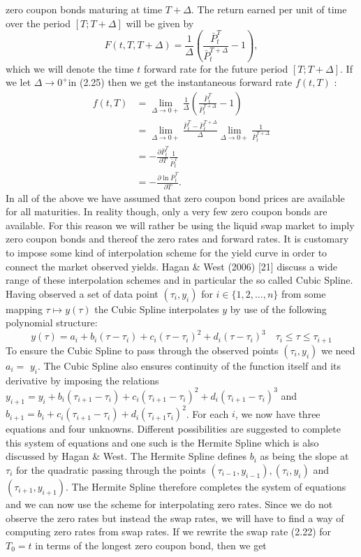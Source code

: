 \documentclass[12pt,twoside]{reedthesis}
\begin{document}
zero coupon bonds maturing at time \(T+\Delta\). The return earned per unit of time over the period \([T ; T+\Delta]\) will be given by
\[
F(t, T, T+\Delta)=\frac{1}{\Delta}\left(\frac{\bar{P}_{t}^{T}}{\bar{P}_{t}^{T+\Delta}}-1\right),
\]
which we will denote the time \(t\) forward rate for the future period \([T ; T+\Delta]\). If we let \(\Delta \rightarrow 0^{+}\)in (2.25) then we get the instantaneous forward rate \(f(t, T)\) :
\[
\begin{aligned}
f(t, T) &=\lim _{\Delta \rightarrow 0+} \frac{1}{\Delta}\left(\frac{\bar{P}_{t}^{T}}{\bar{P}_{t}^{T+\Delta}}-1\right) \\
&=\lim _{\Delta \rightarrow 0+} \frac{\bar{P}_{t}^{T}-\bar{P}_{t}^{T+\Delta}}{\Delta} \lim _{\Delta \rightarrow 0+} \frac{1}{\bar{P}_{t}^{T+\Delta}} \\
&=-\frac{\partial \bar{P}_{t}^{T}}{\partial T} \frac{1}{\bar{P}_{t}^{T}} \\
&=-\frac{\partial \ln \bar{P}_{t}^{T}}{\partial T} .
\end{aligned}
\]
In all of the above we have assumed that zero coupon bond prices are available for all maturities. In reality though, only a very few zero coupon bonds are available. For this reason we will rather be using the liquid swap market to imply zero coupon bonds and thereof the zero rates and forward rates. It is customary to impose some kind of interpolation scheme for the yield curve in order to connect the market observed yields. Hagan \& West (2006) {[}21{]} discuss a wide range of these interpolation schemes and in particular the so called Cubic Spline. Having observed a set of data point \(\left(\tau_{i}, y_{i}\right)\) for \(i \in\{1,2, \ldots, n\}\) from some mapping \(\tau \mapsto y(\tau)\) the Cubic Spline interpolates \(y\) by use of the following polynomial structure:
\[
y(\tau)=a_{i}+b_{i}\left(\tau-\tau_{i}\right)+c_{i}\left(\tau-\tau_{i}\right)^{2}+d_{i}\left(\tau-\tau_{i}\right)^{3} \quad \tau_{i} \leq \tau \leq \tau_{i+1}
\]
To ensure the Cubic Spline to pass through the observed points \(\left(\tau_{i}, y_{i}\right)\) we need \(a_{i}=\) \(y_{i}\). The Cubic Spline also ensures continuity of the function itself and its derivative by imposing the relations \(y_{i+1}=y_{i}+b_{i}\left(\tau_{i+1}-\tau_{i}\right)+c_{i}\left(\tau_{i+1}-\tau_{i}\right)^{2}+d_{i}\left(\tau_{i+1}-\tau_{i}\right)^{3}\) and \(b_{i+1}=b_{i}+c_{i}\left(\tau_{i+1}-\tau_{i}\right)+d_{i}\left(\tau_{i+1} \tau_{i}\right)^{2}\). For each \(i\), we now have three equations and four unknowns. Different possibilities are suggested to complete this system of equations and one such is the Hermite Spline which is also discussed by Hagan \& West. The Hermite Spline defines \(b_{i}\) as being the slope at \(\tau_{i}\) for the quadratic passing through the points \(\left(\tau_{i-1}, y_{i-1}\right),\left(\tau_{i}, y_{i}\right)\) and \(\left(\tau_{i+1}, y_{i+1}\right)\). The Hermite Spline therefore completes the system of equations and we can now use the scheme for interpolating zero rates. Since we do not observe the zero rates but instead the swap rates, we will have to find a way of computing zero rates from swap rates. If we rewrite the swap rate (2.22) for \(T_{0}=t\) in terms of the longest zero coupon bond, then we get
\end{document}
